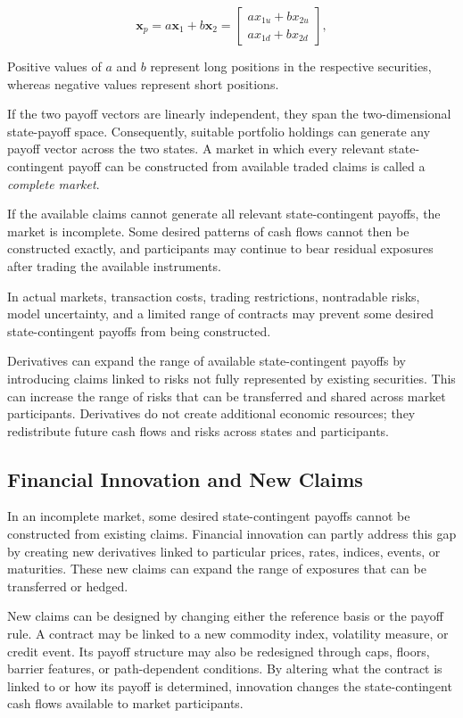 \begin{equation}
\mathbf{x}_p
=
a\mathbf{x}_1+b\mathbf{x}_2
=
\begin{bmatrix}
ax_{1u}+bx_{2u}\\
ax_{1d}+bx_{2d}
\end{bmatrix},
\label{eq:ch11-spanning-portfolio}
\end{equation}

Positive values of $a$ and $b$ represent long
positions in the respective securities, whereas
negative values represent short positions.

If the two payoff vectors are linearly independent,
they span the two-dimensional state-payoff space.
Consequently, suitable portfolio holdings can
generate any payoff vector across the two states.
A market in which every relevant state-contingent
payoff can be constructed from available traded
claims is called a \emph{complete market}.

If the available claims cannot generate all relevant state-contingent payoffs, the market is incomplete. Some desired patterns of cash flows cannot then be constructed exactly, and participants may continue to bear residual exposures after trading the available instruments.

In actual markets, transaction costs, trading restrictions, nontradable risks, model uncertainty, and a limited range of contracts may prevent some desired state-contingent payoffs from being constructed.

Derivatives can expand the range of available state-contingent payoffs by introducing claims linked to risks not fully represented by existing securities. This can increase the range of risks that can be transferred and shared across market participants. Derivatives do not create additional economic resources; they redistribute future cash flows and risks across states and participants.

\subsection{Financial Innovation and New Claims}

In an incomplete market, some desired state-contingent payoffs cannot be constructed from existing claims. Financial innovation can partly address this gap by creating new derivatives linked to particular prices, rates, indices, events, or maturities. These new claims can expand the range of exposures that can be transferred or hedged.

New claims can be designed by changing either the reference basis or the payoff rule. A contract may be linked to a new commodity index, volatility measure, or credit event. Its payoff structure may also be redesigned through caps, floors, barrier features, or path-dependent conditions. By altering what the contract is linked to or how its payoff is determined, innovation changes the state-contingent cash flows available to market participants.

